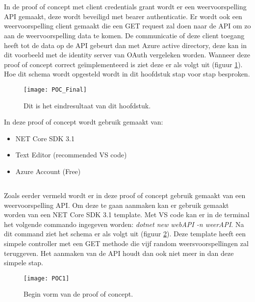 \section{}
\label{sec:Client_Credentials_Grant}
In de proof of concept met client credentials grant wordt er een weervoorspelling API gemaakt, deze wordt beveiligd met bearer authenticatie. Er wordt ook een weervoorspelling client gemaakt die een GET request zal doen naar de API om zo aan de weervoorspelling data te komen. De communicatie of deze client toegang heeft tot de data op de API gebeurt dan met Azure active directory, deze kan in dit voorbeeld met de identity server van OAuth vergeleken worden. Wanneer deze proof of concept correct geïmplementeerd is ziet deze er als volgt uit (figuur \ref{fig:pocfinal}). Hoe dit schema wordt opgesteld wordt in dit hoofdstuk stap voor stap besproken.
\begin{figure}[H]
	\centering
	\texttt{[image: POC\_Final]} 
	\caption[Dit is het eindresultaat van dit hoofdstuk]{Dit is het eindresultaat van dit hoofdstuk.}
	\label{fig:pocfinal}
\end{figure}
In deze proof of concept wordt gebruik gemaakt van:	
\begin{itemize}
	\item NET Core SDK 3.1
	\item Text Editor (recommended VS code)
	\item Azure Account (Free)
\end{itemize}
\subsection{}
Zoals eerder vermeld wordt er in deze proof of concept gebruik gemaakt van een weervoorspelling API. Om deze te gaan aanmaken kan er gebruik gemaakt worden van een NET Core SDK 3.1 template. Met VS code kan er in de terminal het volgende commando ingegeven worden: \emph{dotnet new webAPI -n weerAPI}.\newline
Na dit command ziet het schema er als volgt uit (figuur \ref{fig:poc1}). Deze template heeft een simpele controller met een GET methode die vijf random weersvoorspellingen zal teruggeven. Het aanmaken van de API houdt dan ook niet meer in dan deze simpele stap.
\begin{figure}[H]
	\centering
	\texttt{[image: POC1]} 
	\caption[BeginPOC]{Begin vorm van de proof of concept.}
	\label{fig:poc1}
\end{figure}
